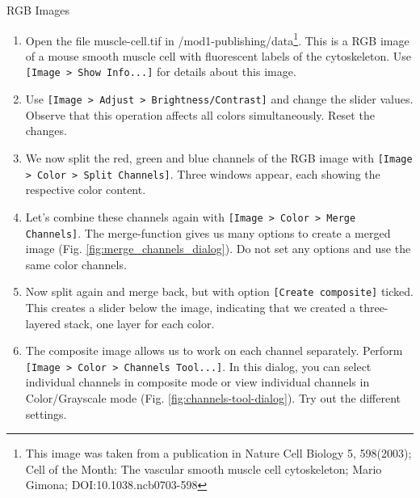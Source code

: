 \begin{taskbox}{RGB Images}

\begin{enumerate}
	\item Open the file muscle-cell.tif in /mod1-publishing/data\footnote{This image was taken from a publication in Nature Cell Biology 5, 598(2003); Cell of the Month: The vascular smooth muscle cell cytoskeleton; Mario Gimona; DOI:10.1038.ncb0703-598}. This is a RGB image of a mouse smooth muscle cell with fluorescent labels of the cytoskeleton. Use \texttt{[Image > Show Info...]} for details about this image.
	\item Use \texttt{[Image > Adjust > Brightness/Contrast]} and change the slider values. Observe that this operation affects all colors simultaneously. Reset the changes.
	\item We now split the red, green and blue channels of the RGB image with \texttt{[Image > Color > Split Channels]}. Three windows appear, each showing the respective color content. 
	\item Let's combine these channels again with \texttt{[Image > Color > Merge Channels]}. The merge-function gives us many options to create a merged image (Fig. \ref{fig:merge_channels_dialog}). Do not set any options and use the same color channels.
	
	\begin{minipage}[t]{\linewidth}
		\begin{center}
		\medskip
		\label{fig:merge-channels-dialog}
		\end{center}
	\end{minipage}
	
	\item Now split again and merge back, but with option \texttt{[Create composite]} ticked. This creates a slider below the image, indicating that we created a three-layered stack, one layer for each color.  
	\item The composite image allows us to work on each channel separately. Perform \texttt{[Image > Color > Channels Tool...]}. In this dialog, you can select individual channels in composite mode or view individual channels in Color/Grayscale mode (Fig. \ref{fig:channels-tool-dialog}). Try out the different settings.
	

\end{enumerate}
\end{taskbox}
